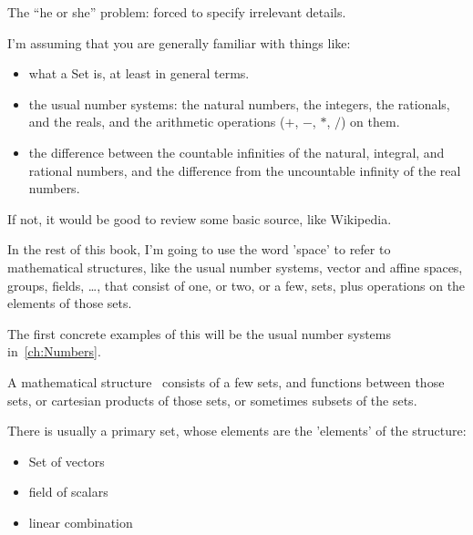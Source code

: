 \documentclass[11pt,openany]{book}
\begin{document}
The ``he or she'' problem: forced to specify irrelevant details.
\setcounter{currentlevel}{\value{baseSectionLevel}}

I'm assuming that you are generally familiar with things like:
\begin{itemize}
  \item what a \gls{Set} is, at least in general terms.
  \item the usual number systems: 
the natural numbers, the integers, the rationals, and the reals, 
and the arithmetic operations ($+$, $-$, $*$, $/$) on them.
\item the difference between the
countable infinities of the natural, integral, and rational numbers,
and the difference from the uncountable infinity of the real numbers.
\end{itemize} 

If not, it would be good to review some basic source, like Wikipedia.

In the rest of this book, I'm going to use the word 'space' to refer to
mathematical structures, like the usual number systems, vector and affine
spaces, groups, fields, \ldots, that consist of one, or two, or a few, sets,
plus operations on the elements of those sets.

The first concrete examples of this will be the usual number systems 
in~\autoref{ch:Numbers}.
\setcounter{currentlevel}{\value{baseSectionLevel}}

\setcounter{currentlevel}{\value{baseSectionLevel}}

\setcounter{currentlevel}{\value{baseSectionLevel}}
A mathematical structure~\cite{wiki:Mathematical-structure} 
consists of a few sets, and functions between those sets,
or cartesian products of those sets,
or sometimes subsets of the sets.

There is usually a primary set, whose elements are the 'elements'
of the structure:

\begin{example}
\begin{itemize}
  \item Set of vectors
  \item field of scalars
  \item linear combination
\end{itemize}
\end{example}
\end{document}
